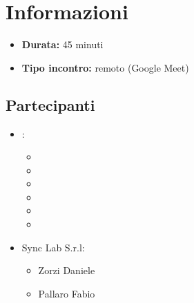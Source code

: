 \section{Informazioni}
\begin{itemize}
	\item \textbf{Durata:} 45 minuti
	\item \textbf{Tipo incontro:} remoto (Google Meet)
\end{itemize}

\subsection{Partecipanti}

\begin{itemize}
	\item \GroupName:
	\begin{itemize}
		\item \stocco
		\item \cristo
		\item \raul
		\item \sebastiano
		\item \martina
		\item \riccardo
	\end{itemize}

	\item Sync Lab S.r.l:
	\begin{itemize}
		\item Zorzi Daniele
		\item Pallaro Fabio
	\end{itemize}
\end{itemize}

\clearpage
